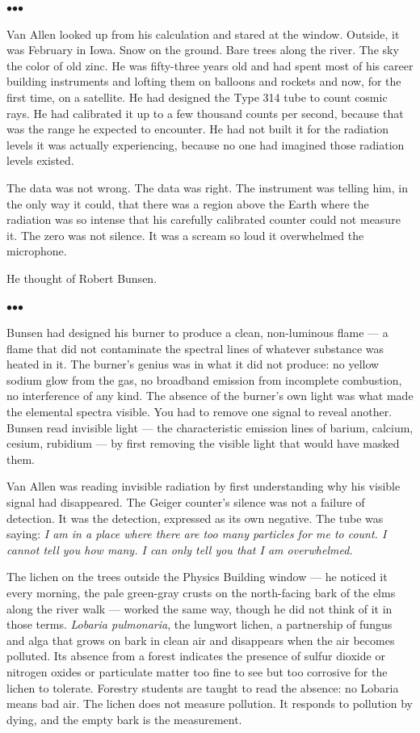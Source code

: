 \documentclass[12pt, letterpaper]{article}
\begin{document}
\bigskip
\centerline{$\bullet$\quad$\bullet$\quad$\bullet$}
\bigskip

Van Allen looked up from his calculation and stared at the window. Outside, it was February in Iowa. Snow on the ground. Bare trees along the river. The sky the color of old zinc. He was fifty-three years old and had spent most of his career building instruments and lofting them on balloons and rockets and now, for the first time, on a satellite. He had designed the Type 314 tube to count cosmic rays. He had calibrated it up to a few thousand counts per second, because that was the range he expected to encounter. He had not built it for the radiation levels it was actually experiencing, because no one had imagined those radiation levels existed.

The data was not wrong. The data was right. The instrument was telling him, in the only way it could, that there was a region above the Earth where the radiation was so intense that his carefully calibrated counter could not measure it. The zero was not silence. It was a scream so loud it overwhelmed the microphone.

He thought of Robert Bunsen.

\bigskip
\centerline{$\bullet$\quad$\bullet$\quad$\bullet$}
\bigskip

Bunsen had designed his burner to produce a clean, non-luminous flame --- a flame that did not contaminate the spectral lines of whatever substance was heated in it. The burner's genius was in what it did not produce: no yellow sodium glow from the gas, no broadband emission from incomplete combustion, no interference of any kind. The absence of the burner's own light was what made the elemental spectra visible. You had to remove one signal to reveal another. Bunsen read invisible light --- the characteristic emission lines of barium, calcium, cesium, rubidium --- by first removing the visible light that would have masked them.

Van Allen was reading invisible radiation by first understanding why his visible signal had disappeared. The Geiger counter's silence was not a failure of detection. It was the detection, expressed as its own negative. The tube was saying: \textit{I am in a place where there are too many particles for me to count. I cannot tell you how many. I can only tell you that I am overwhelmed.}

The lichen on the trees outside the Physics Building window --- he noticed it every morning, the pale green-gray crusts on the north-facing bark of the elms along the river walk --- worked the same way, though he did not think of it in those terms. \textit{Lobaria pulmonaria}, the lungwort lichen, a partnership of fungus and alga that grows on bark in clean air and disappears when the air becomes polluted. Its absence from a forest indicates the presence of sulfur dioxide or nitrogen oxides or particulate matter too fine to see but too corrosive for the lichen to tolerate. Forestry students are taught to read the absence: no Lobaria means bad air. The lichen does not measure pollution. It responds to pollution by dying, and the empty bark is the measurement.
\end{document}
